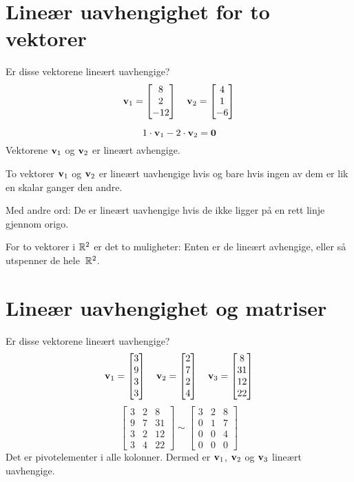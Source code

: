 \begin{ex}
\end{ex}


\section*{Lineær uavhengighet for to vektorer}

\begin{ex}
Er disse vektorene lineært uavhengige?
\[
\mathbf{v}_1 = \begin{bmatrix} 8 \\ 2 \\ -12 \end{bmatrix}\quad
\mathbf{v}_2 = \begin{bmatrix} 4 \\ 1 \\ -6 \end{bmatrix}
\]

\[
1 \cdot \mathbf{v}_1 - 2 \cdot \mathbf{v}_2 = \mathbf{0}
\]
Vektorene $\mathbf{v}_1$ og $\mathbf{v}_2$ er lineært avhengige.
\end{ex}

\begin{thm}
To vektorer $\mathbf{v}_1$ og $\mathbf{v}_2$ er lineært uavhengige hvis og bare
hvis ingen av dem er lik en skalar ganger den andre.
\end{thm}

Med andre ord: De er lineært uavhengige hvis de ikke ligger på en rett
linje gjennom origo.

For to vektorer i $\mathbb{R}^2$ er det to muligheter: Enten er de lineært
avhengige, eller så utspenner de hele~$\mathbb{R}^2$.





\section*{Lineær uavhengighet og matriser}

\begin{ex}
Er disse vektorene lineært uavhengige?
\[
\mathbf{v}_1 = \begin{bmatrix} 3 \\ 9 \\ 3 \\ 3 \end{bmatrix}\quad
\mathbf{v}_2 = \begin{bmatrix} 2 \\ 7 \\ 2 \\ 4 \end{bmatrix}\quad
\mathbf{v}_3 = \begin{bmatrix} 8 \\ 31 \\ 12 \\ 22 \end{bmatrix}
\]
\[
\begin{bmatrix}
3 & 2 & 8 \\
9 & 7 & 31 \\
3 & 2 & 12 \\
3 & 4 & 22
\end{bmatrix}
\sim
\begin{bmatrix}
3 & 2 & 8 \\
0 & 1 & 7 \\
0 & 0 & 4 \\
0 & 0 & 0
\end{bmatrix}
\]
Det er pivotelementer i alle kolonner.  Dermed er $\mathbf{v}_1$,
$\mathbf{v}_2$ og $\mathbf{v}_3$ lineært uavhengige.
\end{ex}


